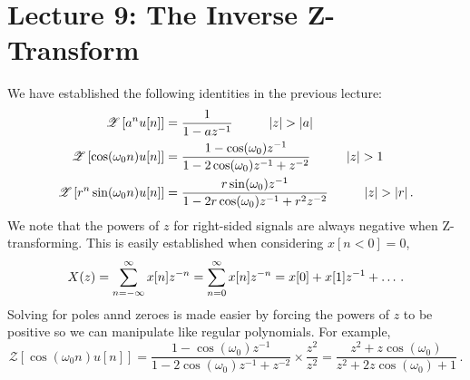 \section{Lecture 9: The Inverse Z-Transform}

We have established the following identities in the previous
lecture:
%
\begin{align*}
  \mathscr{Z}\left[a^n u[n]\right] &= \frac{1}{1-az^{-1}} \hspace{10mm} |z| > |a| \\
  \mathscr{Z}\left[\cos(\omega_0 n) u[n]\right]
  &= \frac{1 - \cos(\omega_0)z^{-1}}{1 - 2\cos(\omega_0)z^{-1} + z^{-2}}
  \hspace{10mm} |z| > 1 \\
  \mathscr{Z}\left[r^n\sin(\omega_0 n)u[n]\right]
  &= \frac{r\sin(\omega_0)z^{-1}}{1 - 2r\cos(\omega_0)z^{-1} + r^2z^{-2}}
  \hspace{10mm} |z| > |r| \,.
\end{align*}
%
We note that the powers of $z$ for right-sided signals are always
negative when Z-transforming. This is easily established when considering
$x[n<0] = 0$,
%
\begin{displaymath}
  X(z) = \sum_{n=-\infty}^\infty x[n]z^{-n} = \sum_{n=0}^\infty x[n]z^{-n} = x[0] + x[1]z^{-1} + \hdots \,.
\end{displaymath}
%
Solving for poles annd zeroes is made easier by forcing the powers of
$z$ to be positive so we can manipulate like regular polynomials. For example,
%
\begin{displaymath}
  \mathscr{Z}\left[\cos(\omega_0 n) u[n]\right]
  = \frac{1 - \cos(\omega_0)z^{-1}}{1 - 2\cos(\omega_0)z^{-1} + z^{-2}} \times \frac{z^2}{z^2}
  = \frac{z^2 + z\cos(\omega_0)}{z^2 + 2z\cos(\omega_0) + 1} \,.
\end{displaymath}

